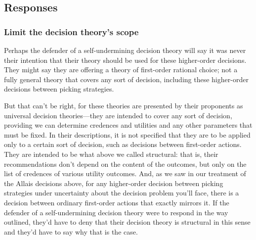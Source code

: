 \documentclass[a4paper]{article}
\newcommand{\todoold}[2][]{\todo[backgroundcolor=white,bordercolor=orange!10,linecolor=gray!10, #1,caption={},textcolor=gray]{Pre-rev: #2}}
\newcommand{\todooldinfo}[2][]{\todoold[#1]{#2}}
\newenvironment{CCM rewritten}
{\begingroup\color{blue}} %
{\endgroup}              %
\begin{document}


\subsection{Responses}

\subsubsection{Limit the decision theory's scope}

	Perhaps the defender of a self-undermining decision theory will say it was never their intention that their theory should be used for these higher-order decisions. They might say they are offering a theory of first-order rational choice; not a fully general theory that covers any sort of decision, including these higher-order decisions between picking strategies. 
	
But that can't be right, for these theories are presented by their proponents as universal decision theories---they are intended to cover any sort of decision, providing we can determine credences and utilities and any other parameters that must be fixed. In their descriptions, it is not specified that they are to be applied only to a certain sort of decision, such as decisions between first-order actions. They are intended to be what above we called structural: that is, their recommendations don't depend on the content of the outcomes, but only on the list of credences of various utility outcomes. And, as we saw in our treatment of the Allais decisions above, for any higher-order decision between picking strategies under uncertainty about the decision problem you'll face, there is a decision between ordinary first-order actions that exactly mirrors it. If the defender of a self-undermining decision theory were to respond in the way outlined, they'd have to deny that their decision theory is structural in this sense and they'd have to say why that is the case.
	
\end{document}
